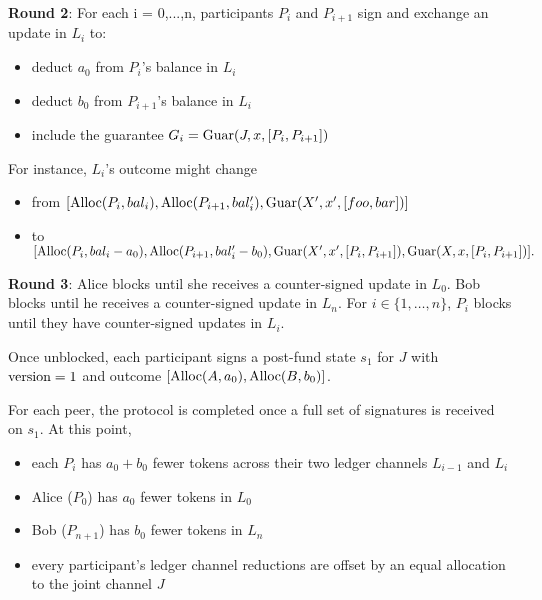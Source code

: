\textbf{Round 2}: For each i = 0,...,n, participants $P_i$ and $P_{i+1}$ sign and exchange an update in $L_i$ to:
\begin{itemize}
    \item deduct $a_0$ from $P_i$'s balance in $L_i$
    \item deduct $b_0$ from $P_{i+1}$'s balance in $L_i$
    \item include the guarantee $G_i = \mbox{Guar}(J, x, [P_i, P_{i+1}])$
\end{itemize}


For instance, $L_i$'s outcome might change
\begin{itemize}
    \item from $[\mbox{Alloc}(P_i, bal_i), \mbox{Alloc}(P_{i+1}, bal_i'), \mbox{Guar}(X', x', [foo, bar])]$
    \item to
$[\mbox{Alloc}(P_i, bal_i - a_0), \mbox{Alloc}(P_{i+1}, bal_i' - b_0), \mbox{Guar}(X', x', [P_i, P_{i+1}]), \mbox{Guar}(X, x, [P_i, P_{i+1}])].$
\end{itemize}


\textbf{Round 3}:
Alice blocks until she receives a counter-signed update in $L_0$. Bob blocks until he receives a counter-signed update in $L_n$. For $i \in \{1,\ldots,n\}$, $P_i$ blocks until they have counter-signed updates in $L_i$.

Once unblocked, each participant signs a post-fund state $s_1$ for $J$ with $\mbox{version} = 1$ and outcome $[\mbox{Alloc}(A, a_0), \mbox{Alloc}(B, b_0)]$.

For each peer, the protocol is completed once a full set of signatures is received on $s_1$. At this point,
\begin{itemize}
    \item each $P_i$ has $a_0 + b_0$ fewer tokens across their two ledger channels $L_{i-1}$ and $L_i$
    \item Alice ($P_0$) has $a_0$ fewer tokens in $L_0$
    \item Bob ($P_{n+1}$) has $b_0$ fewer tokens in $L_{n}$
    \item every participant's ledger channel reductions are offset by an equal allocation to the joint channel $J$
\end{itemize}

